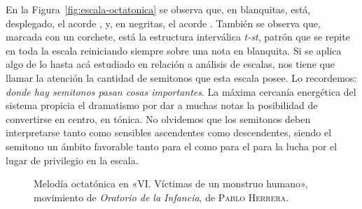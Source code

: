 \documentclass[a4paper,12pt]{article}
\begin{document}
\begin{multicols}{2}
En la Figura~\ref{fig:escala-octatonica} se observa que, en blanquitas, está, desplegado, el acorde , y, en negritas, el acorde \hbox{.} También se observa que, marcada con un corchete, está la estructura interválica \emph{t-st}, patrón que se repite en toda la escala reiniciando siempre sobre una nota en blanquita. Si se aplica algo de lo hasta acá estudiado en relación a análisis de escalas, nos tiene que llamar la atención la cantidad de semitonos que esta escala posee. Lo recordemos: \emph{donde hay semitonos pasan cosas importantes}. La máxima cercanía energética del sistema propicia el dramatismo por dar a muchas notas la posibilidad de convertirse en centro, en tónica. No olvidemos que los semitonos deben interpretarse tanto como sensibles ascendentes como descendentes, siendo el semitono  un ámbito favorable tanto para el  como para el  para la lucha por el lugar de privilegio en la escala.
\end{multicols}

\begin{figure}[ht]
\centering
{}
\caption{Melodía octatónica en «VI. Víctimas de un monstruo humano», movimiento de \emph{Oratorio de la Infancia}, de \textsc{Pablo Herrera}.}\label{fig:melodia-octatonica}
\end{figure}
\end{document}
